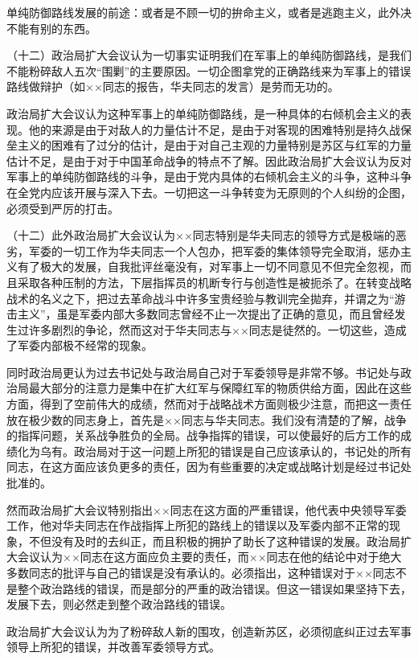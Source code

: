 单纯防御路线发展的前途：或者是不顾一切的拚命主义，或者是逃跑主义，此外决不能有别的东西。

（十二）政治局扩大会议认为一切事实证明我们在军事上的单纯防御路线，是我们不能粉碎敌人五次“围剿”的主要原因。一切企图拿党的正确路线来为军事上的错误路线做辩护（如××同志的报告，华夫同志的发言）是劳而无功的。

政治局扩大会议认为这种军事上的单纯防御路线，是一种具体的右倾机会主义的表现。他的来源是由于对敌人的力量估计不足，是由于对客现的困难特别是持久战保垒主义的困难有了过分的估计，是由于对自己主观的力量特别是苏区与红军的力量估计不足，是由于对于中国革命战争的特点不了解。因此政治局扩大会议认为反对军事上的单纯防御路线的斗争，是由于党内具体的右倾机会主义的斗争，这种斗争在全党内应该开展与深入下去。一切把这一斗争转变为无原则的个人纠纷的企图，必须受到严厉的打击。

（十二）此外政治局扩大会议认为××同志特别是华夫同志的领导方式是极端的恶劣，军委的一切工作为华夫同志一个人包办，把军委的集体领导完全取消，惩办主义有了极大的发展，自我批评丝毫没有，对军事上一切不同意见不但完全忽视，而且采取各种压制的方法，下层指挥员的机断专行与创造性是被扼杀了。在转变战略战术的名义之下，把过去革命战斗中许多宝贵经验与教训完全拋弃，并谓之为“游击主义”，虽是军委内部大多数同志曾经不止一次提出了正确的意见，而且曾经发生过许多剧烈的争论，然而这对于华夫同志与××同志是徒然的。一切这些，造成了军委内部极不经常的现象。

同时政治局更认为过去书记处与政治局自己对于军委领导是非常不够。书记处与政治局最大部分的注意力是集中在扩大红军与保障红军的物质供给方面，因此在这些方面，得到了空前伟大的成绩，然而对于战略战术方面则极少注意，而把这一责任放在极少数的同志身上，首先是××同志与华夫同志。我们没有清楚的了解，战争的指挥问题，关系战争胜负的全局。战争指挥的错误，可以使最好的后方工作的成绩化为乌有。政治局对于这一问题上所犯的错误是自己应该承认的，书记处的所有同志，在这方面应该负更多的责任，因为有些重要的决定或战略计划是经过书记处批准的。

然而政治局扩大会议特别指出××同志在这方面的严重错误，他代表中央领导军委工作，他对华夫同志在作战指挥上所犯的路线上的错误以及军委内部不正常的现象，不但没有及时的去纠正，而且积极的拥护了助长了这种错误的发展。政治局扩大会议认为××同志在这方面应负主要的责任，而××同志在他的结论中对于绝大多数同志的批评与自己的错误是没有承认的。必须指出，这种错误对于××同志不是整个政治路线的错误，而是部分的严重的政治错误。但这一错误如果坚持下去，发展下去，则必然走到整个政治路线的错误。

政治局扩大会议认为为了粉碎敌人新的围攻，创造新苏区，必须彻底纠正过去军事领导上所犯的错误，并改善军委领导方式。

